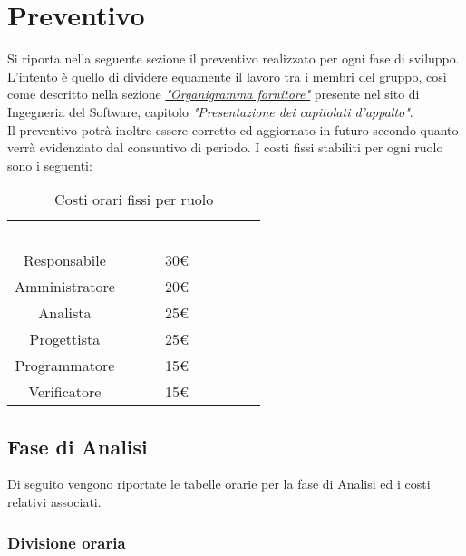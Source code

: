 \section{Preventivo}
Si riporta nella seguente sezione il preventivo realizzato per ogni fase
di sviluppo.\\
L'intento è quello di dividere equamente il lavoro tra i membri del gruppo,
così come descritto nella sezione \href{https://www.math.unipd.it/~tullio/IS-1/2021/Progetto/Capitolati.html}{\textit{"Organigramma fornitore"}}
presente nel sito di Ingegneria del Software, capitolo \textit{"Presentazione dei capitolati d'appalto"}.\\
Il preventivo potrà inoltre essere corretto ed aggiornato in futuro secondo quanto verrà evidenziato dal consuntivo di periodo.
\bigbreak
\noindent
I costi fissi stabiliti per ogni ruolo sono i seguenti:
\begin{table}[htb]
    \centering
    {\renewcommand{\arraystretch}{1.5}
    \begin{tabular}{cccc}
	    \rowcolor[RGB]{33, 73, 50}
	    \textcolor{white}{\textbf{Ruolo}} & \textcolor{white}{\textbf{Costo Orario}}\\
	    \rowcolor[RGB]{216, 235, 171}
	    Responsabile & 30€\\
	    \rowcolor[RGB]{233, 245, 206}
	    Amministratore & 20€\\
        \rowcolor[RGB]{216, 235, 171}
	    Analista & 25€\\
	    \rowcolor[RGB]{233, 245, 206}
	    Progettista & 25€\\
        \rowcolor[RGB]{216, 235, 171}
	    Programmatore & 15€\\
	    \rowcolor[RGB]{233, 245, 206}
	    Verificatore & 15€\\
    \end{tabular}	
}
\caption{Costi orari fissi per ruolo}
\end{table}

\subsection{Fase di Analisi}
Di seguito vengono riportate le tabelle orarie per la fase di Analisi ed i costi relativi associati.
\subsubsection{Divisione oraria}

